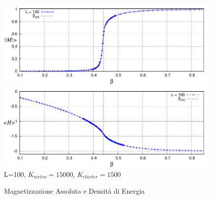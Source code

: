  \begin {figure}[h!p]
    \begin{center}
	\caption[1) ParteA\_MvsBeta.cpp \quad $/\;$ 2) ParteA\_HvsBeta.cpp ]{Magnetizzazione Assoluta e Densità di Energia}\label{fig: MvsBeta}
        \includegraphics[scale=0.8]{Immagini/ParteA/MvsBeta}
     \newline
        \includegraphics[scale=0.8]{Immagini/ParteA/HvsBeta}
     \newline   
	    \footnotesize L=100, $K_{metro} = 15000$, $K_{cluster} = 1500$  
    \end{center}
 \end {figure} 
